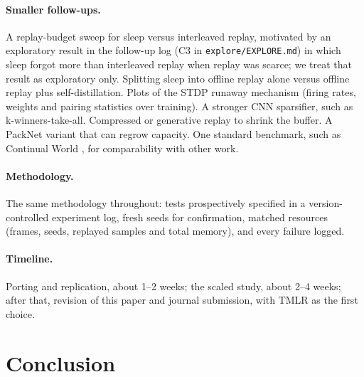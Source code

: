 \documentclass[10pt]{article}
\begin{document}
\paragraph{Smaller follow-ups.} A replay-budget sweep for sleep versus interleaved replay, motivated by an exploratory
result in the follow-up log (C3 in \texttt{explore/EXPLORE.md}) in which sleep forgot more than interleaved replay when
replay was scarce; we treat that result as exploratory only. Splitting sleep into offline replay alone versus offline
replay plus self-distillation. Plots of the STDP runaway mechanism (firing rates, weights and pairing statistics over
training). A stronger CNN sparsifier, such as k-winners-take-all. Compressed or generative replay
\citep{shin2017continual} to shrink the buffer. A PackNet variant \citep{mallya2018packnet} that can regrow capacity.
One standard benchmark, such as Continual World \citep{wolczyk2021continual}, for comparability with other work.

\paragraph{Methodology.} The same methodology throughout: tests prospectively specified in a version-controlled
experiment log, fresh seeds for confirmation, matched resources (frames, seeds, replayed samples and total memory), and
every failure logged.

\paragraph{Timeline.} Porting and replication, about 1--2 weeks; the scaled study, about 2--4 weeks; after that,
revision of this paper and journal submission, with TMLR as the first choice.
\fi

\section{Conclusion}
\label{sec:conclusion}
\end{document}
